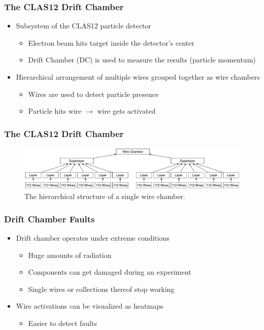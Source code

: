 \begin{frame}
  \frametitle{The CLAS12 Drift Chamber}
  \begin{itemize}
    \item Subsystem of the CLAS12 particle detector
      \begin{itemize}
        \item Electron beam hits target inside the detector's center
        \item Drift Chamber (DC) is used to measure the results
          (particle momentum)
      \end{itemize}
    \item Hierarchical arrangement of multiple wires grouped together
      as wire chambers
      \begin{itemize}
        \item Wires are used to detect particle presence
        \item Particle hits wire \(\rightarrow\) wire gets activated
      \end{itemize}
  \end{itemize}
\end{frame}

\begin{frame}
  \frametitle{The CLAS12 Drift Chamber}
  \begin{figure}
    \includegraphics[width=\textwidth]{../figures/wire_chamber}
    \caption{The hierarchical structure of a single wire chamber.}
  \end{figure}
\end{frame}

\begin{frame}
  \frametitle{Drift Chamber Faults}
  \begin{itemize}
    \item Drift chamber operates under extreme conditions
      \begin{itemize}
        \item Huge amounts of radiation
        \item Components can get damaged during an experiment
        \item Single wires or collections thereof stop working
      \end{itemize}
    \item Wire activations can be visualized as heatmaps
      \begin{itemize}
        \item Easier to detect faults
      \end{itemize}
  \end{itemize}
\end{frame}


